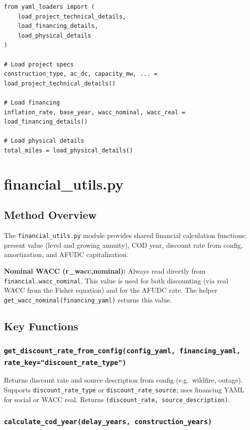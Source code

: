 \documentclass[ctcc_full_documentation.tex]{subfiles}
\begin{document}
\begin{lstlisting}
from yaml_loaders import (
    load_project_technical_details,
    load_financing_details,
    load_physical_details
)

# Load project specs
construction_type, ac_dc, capacity_mw, ... = load_project_technical_details()

# Load financing
inflation_rate, base_year, wacc_nominal, wacc_real = load_financing_details()

# Load physical details
total_miles = load_physical_details()
\end{lstlisting}

\section{financial\_utils.py}

\subsection{Method Overview}

The \texttt{financial\_utils.py} module provides shared financial calculation functions: present value (level and growing annuity), COD year, discount rate from config, amortization, and AFUDC capitalization.

\textbf{Nominal WACC (r\_wacc,nominal):} Always read directly from \texttt{financial.wacc\_nominal}. This value is used for both discounting (via real WACC from the Fisher equation) and for the AFUDC rate. The helper \texttt{get\_wacc\_nominal(financing\_yaml)} returns this value.

\subsection{Key Functions}

\subsubsection{\texttt{get\_discount\_rate\_from\_config(config\_yaml, financing\_yaml, rate\_key="discount\_rate\_type")}}

Returns discount rate and source description from config (e.g.\ wildfire, outage). Supports \texttt{discount\_rate\_type} or \texttt{discount\_rate\_source}; uses financing YAML for social or WACC real. Returns \texttt{(discount\_rate, source\_description)}.

\subsubsection{\texttt{calculate\_cod\_year(delay\_years, construction\_years)}}
\end{document}
